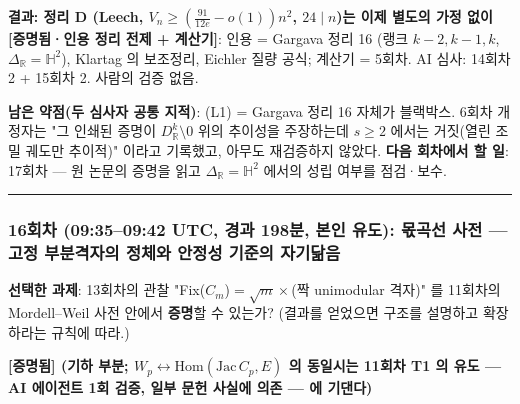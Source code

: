 \textbf{결과: 정리 D (Leech, \(V_n\ge(\frac{91}{12e}-o(1))n^2\), \(24\mid n\))는 이제 별도의 가정 없이 {[}증명됨·인용 정리 전제 + 계산기{]}}: 인용 = Gargava 정리 16 (랭크 \(k-2,k-1,k\), \(\Delta_\mathbb R=\mathbb H^2\)), Klartag 의 보조정리, Eichler 질량 공식; 계산기 = 5회차. AI 심사: 14회차 2 + 15회차 2. 사람의 검증 없음.

\textbf{남은 약점(두 심사자 공통 지적)}: (L1) = Gargava 정리 16 자체가 블랙박스. 6회차 개정자는 "그 인쇄된 증명이 \(D_\mathbb R^k\setminus0\) 위의 추이성을 주장하는데 \(s\ge2\) 에서는 거짓(열린 조밀 궤도만 추이적)" 이라고 기록했고, 아무도 재검증하지 않았다. \textbf{다음 회차에서 할 일}: 17회차 --- 원 논문의 증명을 읽고 \(\Delta_\mathbb R=\mathbb H^2\) 에서의 성립 여부를 점검·보수.

\begin{center}\rule{0.5\linewidth}{0.5pt}\end{center}

\hypertarget{uxd68cuxcc28-09350942-utc-uxacbduxacfc-198uxbd84-uxbcf8uxc778-uxc720uxb3c4-uxbaabuxace1uxc120-uxc0acuxc804-uxace0uxc815-uxbd80uxbd84uxaca9uxc790uxc758-uxc815uxccb4uxc640-uxc548uxc815uxc131-uxae30uxc900uxc758-uxc790uxae30uxb2eeuxc74c}{%
\subsubsection*{16회차 (09:35--09:42 UTC, 경과 198분, 본인 유도): 몫곡선 사전 --- 고정 부분격자의 정체와 안정성 기준의 자기닮음}\label{uxd68cuxcc28-09350942-utc-uxacbduxacfc-198uxbd84-uxbcf8uxc778-uxc720uxb3c4-uxbaabuxace1uxc120-uxc0acuxc804-uxace0uxc815-uxbd80uxbd84uxaca9uxc790uxc758-uxc815uxccb4uxc640-uxc548uxc815uxc131-uxae30uxc900uxc758-uxc790uxae30uxb2eeuxc74c}}

\textbf{선택한 과제}: 13회차의 관찰 "Fix(\(C_m\))\(=\sqrt m\times\)(짝 unimodular 격자)" 를 11회차의 Mordell--Weil 사전 안에서 \textbf{증명}할 수 있는가? (결과를 얻었으면 구조를 설명하고 확장하라는 규칙에 따라.)

\textbf{{[}증명됨{]} (기하 부분; \(W_p\leftrightarrow\mathrm{Hom}(\mathrm{Jac}\,C_p,E)\) 의 동일시는 11회차 T1 의 유도 --- AI 에이전트 1회 검증, 일부 문헌 사실에 의존 --- 에 기댄다)}

